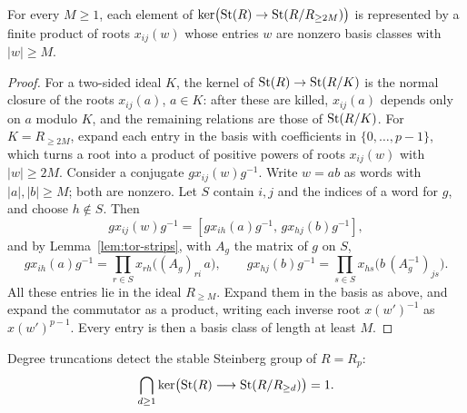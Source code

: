 \begin{lemma}\label{lem:det-high}
For every $M\geq1$, each element of $\ker\bigl(\operatorname{St}(R)\to\operatorname{St}(R/R_{\geq2M})\bigr)$ is represented by a finite product of
roots $x_{ij}(w)$ whose entries $w$ are nonzero basis classes with $|w|\geq M$.
\end{lemma}

\begin{proof}
For a two-sided ideal $K$, the kernel of $\operatorname{St}(R)\to\operatorname{St}(R/K)$ is the normal closure of the roots $x_{ij}(a)$, $a\in K$:
after these are killed, $x_{ij}(a)$ depends only on $a$ modulo $K$, and the remaining relations are those of
$\operatorname{St}(R/K)$. For $K=R_{\geq2M}$, expand each entry in the basis with coefficients in $\{0,\dots,p-1\}$, which turns a root
into a product of positive powers of roots $x_{ij}(w)$ with $|w|\geq2M$. Consider a conjugate $gx_{ij}(w)g^{-1}$. Write
$w=ab$ as words with $|a|,|b|\geq M$; both are nonzero. Let $S$ contain $i,j$ and the indices of a word for $g$, and
choose $h\notin S$. Then
\[
 gx_{ij}(w)g^{-1}=[gx_{ih}(a)g^{-1},\,gx_{hj}(b)g^{-1}],
\]
and by Lemma~\ref{lem:tor-strips}, with $A_g$ the matrix of $g$ on $S$,
\[
 gx_{ih}(a)g^{-1}=\prod_{r\in S}x_{rh}\bigl((A_g)_{ri}\,a\bigr),\qquad
 gx_{hj}(b)g^{-1}=\prod_{s\in S}x_{hs}\bigl(b\,(A_g^{-1})_{js}\bigr).
\]
All these entries lie in the ideal $R_{\geq M}$. Expand them in the basis as above, and expand the commutator as a
product, writing each inverse root $x(w')^{-1}$ as $x(w')^{p-1}$. Every entry is then a basis class of length at least
$M$.
\end{proof}

\begin{theorem}\label{thm:det-detection}
Degree truncations detect the stable Steinberg group of $R=R_p$:
\[
 \bigcap_{d\geq1}\ker\bigl(\operatorname{St}(R)\longrightarrow\operatorname{St}(R/R_{\geq d})\bigr)=1.
\]
\end{theorem}

